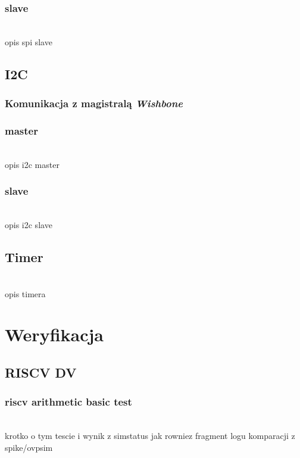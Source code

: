 \documentclass[11pt,a4paper]{article}
\begin{document}
		\subsubsection{slave}
		
		\hspace{5mm}
			\\opis spi slave

	\subsection{I2C}
		\subsubsection{Komunikacja z magistralą \textit{Wishbone}}
		\subsubsection{master}
		\hspace{5mm}
			\\opis i2c master
		\subsubsection{slave}
		\hspace{5mm}
			\\opis i2c slave

	\subsection{Timer}
	\hspace{5mm}
		\\opis timera


\newpage
\section{Weryfikacja}

	\subsection{RISCV DV}
		\subsubsection{riscv arithmetic basic test}
		\hspace{5mm}
			\\krotko o tym tescie i wynik z simstatus jak rowniez fragment logu komparacji z spike/ovpsim
			
\end{document}
